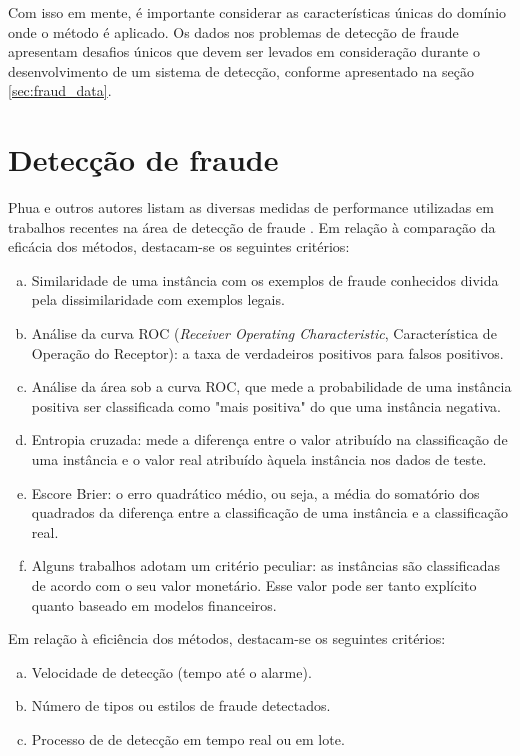 Com isso em mente, é importante considerar as características únicas do domínio onde o método é aplicado. Os dados nos problemas de detecção de fraude apresentam desafios únicos que devem ser levados em consideração durante o desenvolvimento de um sistema de detecção, conforme apresentado na seção \ref{sec:fraud_data}.

\section{Detecção de fraude}
\label{sec:fraud_criteria}

Phua e outros autores listam as diversas medidas de performance utilizadas em trabalhos recentes na área de detecção de fraude \cite{Phua2010}. Em relação à comparação da eficácia dos métodos, destacam-se os seguintes critérios:

\begin{enumerate}[a)]
    \item Similaridade de uma instância com os exemplos de fraude conhecidos divida pela dissimilaridade com exemplos legais.
    \item Análise da curva ROC (\emph{Receiver Operating Characteristic}, Característica de Operação do Receptor): a taxa de verdadeiros positivos para falsos positivos.
    \item Análise da área sob a curva ROC, que mede a probabilidade de uma instância positiva ser classificada como "mais positiva" do que uma instância negativa.
    \item Entropia cruzada: mede a diferença entre o valor atribuído na classificação de uma instância e o valor real atribuído àquela instância nos dados de teste.
    \item Escore Brier: o erro quadrático médio, ou seja, a média do somatório dos quadrados da diferença entre a classificação de uma instância e a classificação real.
    \item Alguns trabalhos adotam um critério peculiar: as instâncias são classificadas de acordo com o seu valor monetário. Esse valor pode ser tanto explícito quanto baseado em modelos financeiros.
\end{enumerate}

Em relação à eficiência dos métodos, destacam-se os seguintes critérios:

\begin{enumerate}[a)]
    \item Velocidade de detecção (tempo até o alarme).
    \item Número de tipos ou estilos de fraude detectados.
    \item Processo de de detecção em tempo real ou em lote.
\end{enumerate}

